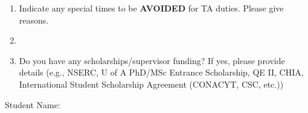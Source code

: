 \documentclass[11pt]{report}
\begin{document}
\begin{enumerate}
\item 
  Indicate any special times to be {\bf AVOIDED} for TA duties.
  Please give reasons.
  \TextField[maxlen=600,name=avoid,
    width=\linewidth,align=0,multiline=true]{\\}

\item 

\item
  Do you have any scholarships/supervisor funding?  If yes, please provide details  
  (e.g., NSERC, U of A PhD/MSc Entrance Scholarship, QE II, CHIA, International Student Scholarship Agreement (CONACYT, CSC, etc.))
  \TextField[maxlen=600,name=funding,
    width=\linewidth,align=0,multiline=true]{\\}
\end{enumerate}

\noindent Student Name: \TextField[maxlen=30,name=myname,align=0,width=\stringwidth]{}
\end{document}
